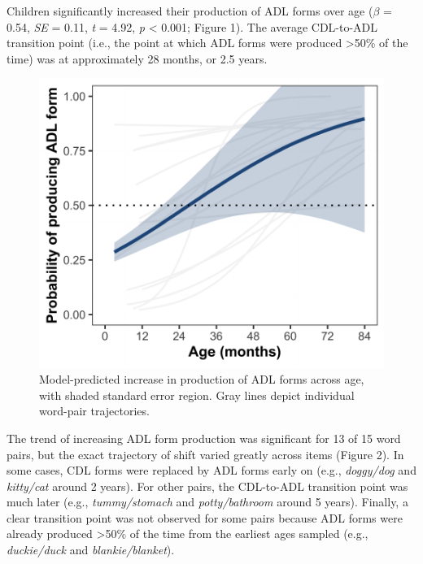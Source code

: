 \documentclass[10pt, letterpaper]{article}
\newenvironment{CodeChunk}{}{}
\begin{document}
Children significantly increased their production of ADL forms over age
(\(\beta\) = 0.54, \emph{SE} = 0.11, \emph{t} = 4.92, \emph{p}
\textless{} 0.001; Figure 1). The average CDL-to-ADL transition point
(i.e., the point at which ADL forms were produced \textgreater50\% of
the time) was at approximately 28 months, or 2.5 years.

\begin{CodeChunk}
\begin{figure}[h]

{\centering \includegraphics{figs/shift-timing-fig-1} 

}

\caption[Model-predicted increase in production of ADL forms across age, with shaded standard error region]{Model-predicted increase in production of ADL forms across age, with shaded standard error region. Gray lines depict individual word-pair trajectories.}\label{fig:shift-timing-fig}
\end{figure}
\end{CodeChunk}

The trend of increasing ADL form production was significant for 13 of 15
word pairs, but the exact trajectory of shift varied greatly across
items (Figure 2). In some cases, CDL forms were replaced by ADL forms
early on (e.g., \emph{doggy/dog} and \emph{kitty/cat} around 2 years).
For other pairs, the CDL-to-ADL transition point was much later (e.g.,
\emph{tummy/stomach} and \emph{potty/bathroom} around 5 years). Finally,
a clear transition point was not observed for some pairs because ADL
forms were already produced \textgreater50\% of the time from the
earliest ages sampled (e.g., \emph{duckie/duck} and
\emph{blankie/blanket}).
\end{document}
